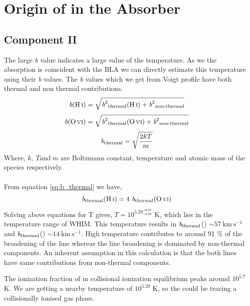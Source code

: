 \section{Origin of {} in the Absorber}


\subsection{Component II} \label{sec:temp_calc_b}

The large \emph{b} value indicates a large value of the temperature. As we the  absorption is coincident with the BLA we can directly estimate this temperature using their \emph{b} values. The \emph{b} values which we get from Voigt profile have both thermal and non thermal contributions. 
\begin{equation} \label{eq:b_HI}
\emph{b}(\ion{H}{i})=\sqrt{{{\emph{b}^2}_{\text{thermal}}(\ion{H}{i})}+{{\emph{b}^2}_{\text{non-thermal}}}}
\end{equation}
\begin{equation}
\emph{b}(\ion{O}{vi})=\sqrt{{{\emph{b}^2}_{\text{thermal}}(\ion{O}{vi})}+{{\emph{b}^2}_{\text{non-thermal}}}}
\end{equation}
\begin{equation} \label{eq:b_thermal}
\emph{b}_{\text{thermal}}=\sqrt{\frac{2kT}{m}}
\end{equation}
Where, $k, \ T \text{and} \ m$ are Boltzmann constant, temperature and atomic mass of the species respectively.
\\\\
From equation \ref{eq:b_thermal} we have,
\begin{equation}
{\emph{b}}_{\text{thermal}}(\ion{H}{i})=4\ {\emph{b}}_{\text{thermal}}(\ion{O}{vi})
\end{equation}
Solving above equations for T gives, $T={10}^{{5.29}_{-0.08}^{+0.07}}$ K, which lies in the temperature range of WHIM. This temperature results in ${\emph{b}}_{\text{thermal}}$() $\sim 57 \ \text{km} \  \text{s}^{-1}$ and ${\emph{b}}_{\text{thermal}}$() $\sim 14 \ \text{km} \  \text{s}^{-1}$. High temperature contributes to around 91 \% of the broadening of the  line whereas the  line broadening is dominated by non-thermal components. An inherent assumption in this calculation is that the both lines have same contributions from non-thermal components. 

The ionization fraction of  in collisional ionization equilibrium peaks around $10^{5.7}$ K. We are getting a nearby temperature of ${10}^{5.29}$ K, so the  could be tracing a collisionally ionised gas phase. 

